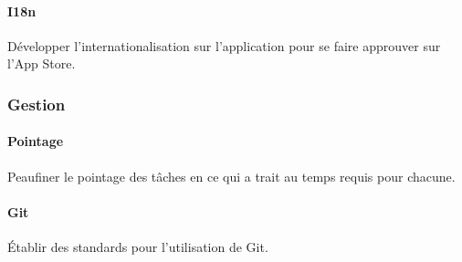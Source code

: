 \paragraph{I18n} Développer l'internationalisation sur l'application pour se faire approuver sur l'App Store.

\subsubsection{Gestion}

\paragraph{Pointage} Peaufiner le pointage des tâches en ce qui a trait au temps requis pour chacune.

\paragraph{Git} Établir des standards pour l'utilisation de Git.